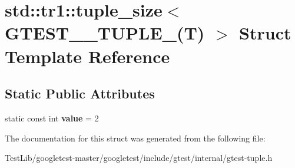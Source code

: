 \hypertarget{structstd_1_1tr1_1_1tuple__size_3_01GTEST__2__TUPLE___07T_08_01_4}{}\section{std\+:\+:tr1\+:\+:tuple\+\_\+size$<$ G\+T\+E\+S\+T\+\_\+\_\+\+T\+U\+P\+L\+E\+\_\+(T) $>$ Struct Template Reference}
\label{structstd_1_1tr1_1_1tuple__size_3_01GTEST__2__TUPLE___07T_08_01_4}
\subsection*{Static Public Attributes}
\begin{DoxyCompactItemize}
\item 
\mbox{\label{structstd_1_1tr1_1_1tuple__size_3_01GTEST__2__TUPLE___07T_08_01_4_a18545d733fa1f811712aa1153d8ba5d9}} 
static const int {\bfseries value} = 2
\end{DoxyCompactItemize}


The documentation for this struct was generated from the following file\+:\begin{DoxyCompactItemize}
\item 
Test\+Lib/googletest-\/master/googletest/include/gtest/internal/gtest-\/tuple.\+h\end{DoxyCompactItemize}
